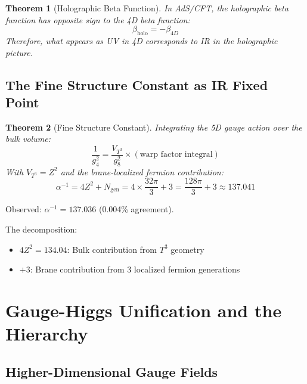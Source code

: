 \documentclass[12pt,a4paper]{article}
\newtheorem{theorem}{Theorem}[section]
\begin{document}
\begin{theorem}[Holographic Beta Function]
In AdS/CFT, the holographic beta function has \textit{opposite sign} to the 4D beta function:
\begin{equation}
\beta_{\text{holo}} = -\beta_{4D}
\end{equation}
Therefore, what appears as UV in 4D corresponds to IR in the holographic picture.
\end{theorem}

\subsection{The Fine Structure Constant as IR Fixed Point}

\begin{theorem}[Fine Structure Constant]
Integrating the 5D gauge action over the bulk volume:
\begin{equation}
\frac{1}{g_4^2} = \frac{V_{T^3}}{g_8^2} \times (\text{warp factor integral})
\end{equation}
With $V_{T^3} = Z^2$ and the brane-localized fermion contribution:
\begin{equation}
\alpha^{-1} = 4Z^2 + N_{\text{gen}} = 4 \times \frac{32\pi}{3} + 3 = \frac{128\pi}{3} + 3 \approx 137.041
\end{equation}
\end{theorem}

Observed: $\alpha^{-1} = 137.036$ (0.004\% agreement).

The decomposition:
\begin{itemize}
    \item $4Z^2 = 134.04$: Bulk contribution from $T^3$ geometry
    \item $+3$: Brane contribution from 3 localized fermion generations
\end{itemize}

\section{Gauge-Higgs Unification and the Hierarchy}

\subsection{Higher-Dimensional Gauge Fields}
\end{document}
